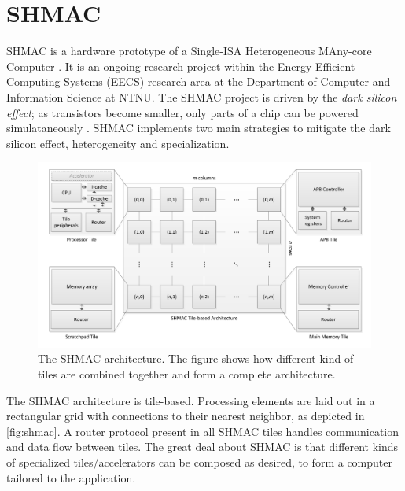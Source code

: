 \section{SHMAC}

SHMAC is a hardware prototype of a Single-ISA Heterogeneous MAny-core Computer
\cite{shmacsliedes, shmacwebpage, Rusten567042}. It is an ongoing research
project within the Energy Efficient Computing Systems (EECS) research area at
the Department of Computer and Information Science at NTNU. The SHMAC project is
driven by the \textit{dark silicon effect}; as transistors become smaller, only
parts of a chip can be powered simulataneously \cite{esmaeilzadeh2011dark}.
SHMAC implements two main strategies to mitigate the dark silicon effect,
heterogeneity and specialization.

\begin{figure}
    \centering
    \includegraphics[width=1.0\textwidth]{figs/shmac-high-level2.png}
    \caption{The SHMAC architecture. The figure shows how different kind of
    tiles are combined together and form a complete architecture.}
    \label{fig:shmac}
\end{figure}

The SHMAC architecture is tile-based. Processing elements are laid out in a
rectangular grid with connections to their nearest neighbor, as depicted in
\autoref{fig:shmac}. A router protocol present in all SHMAC tiles handles
communication and data flow between tiles.  The great deal about SHMAC is that
different kinds of specialized tiles/accelerators can be composed as desired, to
form a computer tailored to the application.
